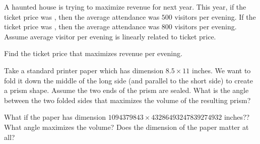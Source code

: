 \documentclass[../main.tex]{subfiles}
\begin{document}
  \begin{example}
    A haunted house is trying to maximize revenue for next year. This year, if the ticket price was , then the average attendance was \(500\) visitors per evening. If the ticket price was , then the average attendance was \(800\) visitors per evening.  Assume average visitor per evening is linearly related to ticket price.

    Find the ticket price that maximizes revenue per evening. 
  \end{example}

  \begin{example}
    Take a standard printer paper which has dimension \(8.5 \times 11\) inches. We want to fold it down the middle of the long side (and parallel to the short side) to create a prism shape. Assume the two ends of the prism are sealed. What is the angle between the two folded sides that maximizes the volume of the resulting prism?


    \faComment{} What if the paper has dimension \(1094379843 \times 43286493247839274932\) inches?? What angle maximizes the volume? Does the dimension of the paper matter at all?
  \end{example}
\end{document}
